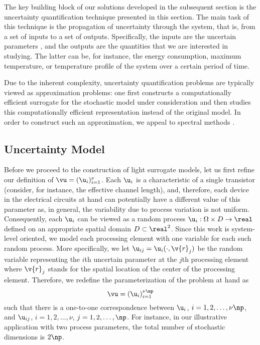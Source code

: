 The key building block of our solutions developed in the subsequent section is
the uncertainty quantification technique presented in this section. The main
task of this technique is the propagation of uncertainty through the system,
that is, from a set of inputs to a set of outputs. Specifically, the inputs are
the uncertain parameters \vu, and the outputs are the quantities that we are
interested in studying. The latter can be, for instance, the energy consumption,
maximum temperature, or temperature profile of the system over a certain period
of time.

Due to the inherent complexity, uncertainty quantification problems are
typically viewed as approximation problems: one first constructs a
computationally efficient surrogate for the stochastic model under consideration
and then studies this computationally efficient representation instead of the
original model. In order to construct such an approximation, we appeal to
spectral methods \cite{maitre2010, janson1997, eldred2008}.

\subsection{Uncertainty Model}

Before we proceed to the construction of light surrogate models, let us first
refine our definition of $\vu = (\u_i)_{i = 1}^\nu$. Each $\u_i$ is a
characteristic of a single transistor (consider, for instance, the effective
channel length), and, therefore, each device in the electrical circuits at hand
can potentially have a different value of this parameter as, in general, the
variability due to process variation is not uniform. Consequently, each $\u_i$
can be viewed as a random process $\u_i: \Omega \times D \to \real$ defined on
an appropriate spatial domain $D \subset \real^2$. Since this work is
system-level oriented, we model each processing element with one variable for
each such random process. More specifically, we let $\u_{ij} = \u_i(\cdot,
\v{r}_j)$ be the random variable representing the $i$th uncertain parameter at
the $j$th processing element where $\v{r}_j$ stands for the spatial location of
the center of the processing element. Therefore, we redefine the
parameterization \vu of the problem at hand as
\[
  \vu = (\u_i)_{i = 1}^{\nu \np}
\]
such that there is a one-to-one correspondence between $\u_i$, $i = 1, 2, \dots,
\nu \np$, and $\u_{ij}$, $i = 1, 2, \dots, \nu$, $j = 1, 2, \dots, \np$. For
instance, in our illustrative application with two process parameters, the total
number of stochastic dimensions is $2 \np$.

